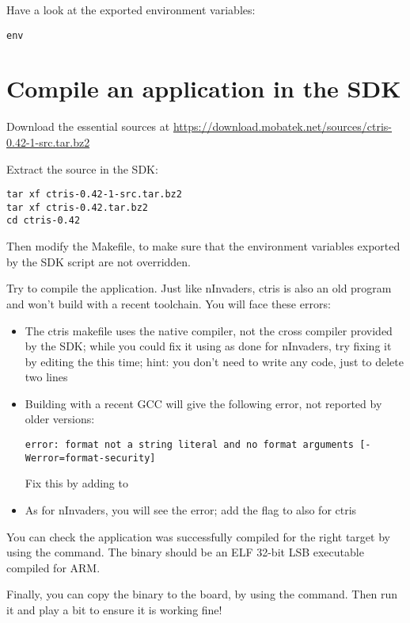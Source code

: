 Have a look at the exported environment variables:
\begin{verbatim}
env
\end{verbatim}

\section{Compile an application in the SDK}

Download the essential  sources at
\url{https://download.mobatek.net/sources/ctris-0.42-1-src.tar.bz2}

Extract the source in the SDK:
\begin{verbatim}
tar xf ctris-0.42-1-src.tar.bz2
tar xf ctris-0.42.tar.bz2
cd ctris-0.42
\end{verbatim}

Then modify the Makefile, to make sure that the environment variables exported
by the SDK script are not overridden.

Try to compile the application. Just like nInvaders, ctris is also an old
program and won't build with a recent toolchain. You will face these
errors:

\begin{itemize}
  \item The ctris makefile uses the native compiler, not the cross compiler
  provided by the SDK; while you could fix it using  as done
  for nInvaders, try fixing it by editing the  this time;
  hint: you don't need to write any code, just to delete two lines

  \item Building with a recent GCC will give the following error, not
  reported by older versions:
\begin{verbatim}
error: format not a string literal and no format arguments [-Werror=format-security]
\end{verbatim}
  Fix this by adding  to 

  \item As for nInvaders, you will see the 
  error; add the  flag to  also for ctris

\end{itemize}

You can check the application was successfully compiled for the right
target by using the  command.  The  binary should be
an ELF 32-bit LSB executable compiled for ARM.

Finally, you can copy the binary to the board, by using the 
command. Then run it and play a bit to ensure it is working fine!

